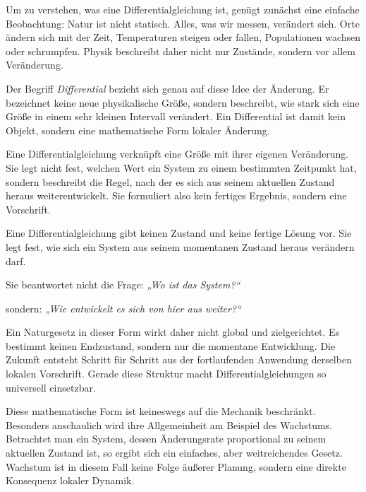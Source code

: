 Um zu verstehen, was eine Differentialgleichung ist,
genügt zunächst eine einfache Beobachtung:
Natur ist nicht statisch.
Alles, was wir messen, verändert sich.
Orte ändern sich mit der Zeit,
Temperaturen steigen oder fallen,
Populationen wachsen oder schrumpfen.
Physik beschreibt daher nicht nur Zustände,
sondern vor allem Veränderung.

Der Begriff \emph{Differential}
bezieht sich genau auf diese Idee der Änderung.
Er bezeichnet keine neue physikalische Größe,
sondern beschreibt,
wie stark sich eine Größe in einem sehr kleinen Intervall verändert.
Ein Differential ist damit kein Objekt,
sondern eine mathematische Form lokaler Änderung.

Eine Differentialgleichung verknüpft eine Größe
mit ihrer eigenen Veränderung.
Sie legt nicht fest,
welchen Wert ein System zu einem bestimmten Zeitpunkt hat,
sondern beschreibt die Regel,
nach der es sich aus seinem aktuellen Zustand heraus weiterentwickelt.
Sie formuliert also kein fertiges Ergebnis,
sondern eine Vorschrift.

\begin{DidacticBox}
	\label{box:differential}
	Eine Differentialgleichung gibt keinen Zustand
	und keine fertige Lösung vor.
	Sie legt fest,
	wie sich ein System aus seinem momentanen Zustand heraus verändern darf.
	
	Sie beantwortet nicht die Frage:
	\emph{„Wo ist das System?“}
	
	sondern:
	\emph{„Wie entwickelt es sich von hier aus weiter?“}
\end{DidacticBox}

Ein Naturgesetz in dieser Form
wirkt daher nicht global und zielgerichtet.
Es bestimmt keinen Endzustand,
sondern nur die momentane Entwicklung.
Die Zukunft entsteht Schritt für Schritt
aus der fortlaufenden Anwendung derselben lokalen Vorschrift.
Gerade diese Struktur macht Differentialgleichungen
so universell einsetzbar.

Diese mathematische Form ist keineswegs
auf die Mechanik beschränkt.
Besonders anschaulich wird ihre Allgemeinheit
am Beispiel des Wachstums.
Betrachtet man ein System,
dessen Änderungsrate proportional zu seinem aktuellen Zustand ist,
so ergibt sich ein einfaches,
aber weitreichendes Gesetz.
Wachstum ist in diesem Fall
keine Folge äußerer Planung,
sondern eine direkte Konsequenz lokaler Dynamik.

